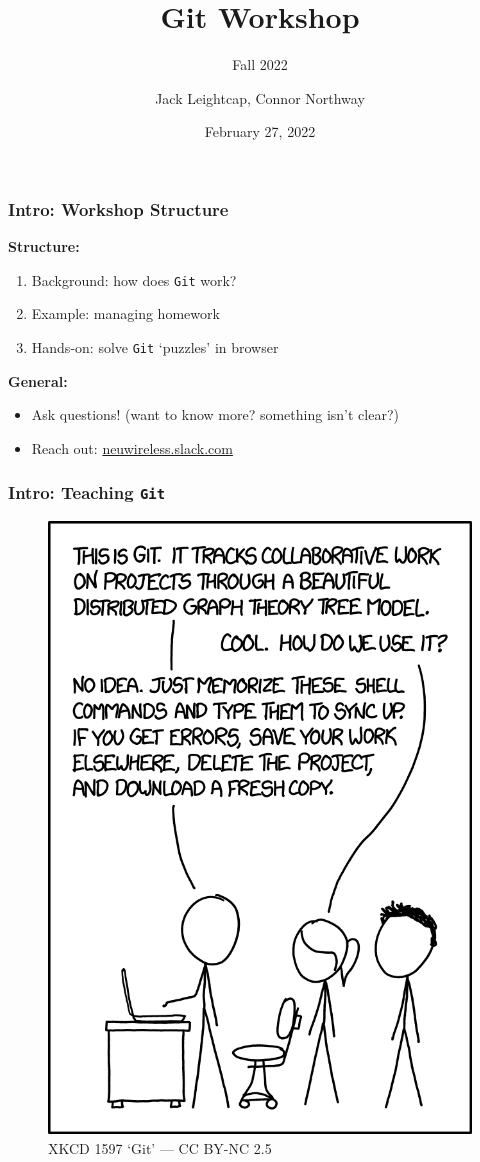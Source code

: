 \documentclass{beamer} \usetheme{Madrid}
\title{Git Workshop}
\subtitle{Fall 2022}
\author[]{Jack Leightcap\inst{1}\inst{2}, Connor Northway\inst{2}}
\institute[IEEE, Wireless Club]{
	\inst{1}IEEE -- \url{nuieeeofficers@gmail.com}
	\and
	\inst{2}Wireless Club -- \url{nuwirelessclub@gmail.com}
}
\date[Fall 2022]{February 27, 2022}
\begin{document}
\frame{\titlepage}

\begin{frame}
	\frametitle{Intro: Workshop Structure}
	\centering \textbf{Structure:}
	\begin{enumerate}
		\setlength\itemsep{1em}
		\item Background: how does \texttt{Git} work?
		\item Example: managing homework
		\item Hands-on: solve \texttt{Git} `puzzles' in browser
	\end{enumerate}
	\vfill
	\centering \textbf{General:}
	\begin{itemize}
		\setlength\itemsep{1em}
		\item Ask questions!
		      (want to know more? something isn't clear?)
		\item Reach out: \url{neuwireless.slack.com}
	\end{itemize}
\end{frame}

\begin{frame}
	\frametitle{Intro: Teaching \texttt{Git}}
	\begin{figure}
		\includegraphics[height=\textheight-25mm]{xkcd.png}
		\caption{XKCD 1597 `Git' --- CC BY-NC 2.5}
	\end{figure}
\end{frame}
\end{document}
